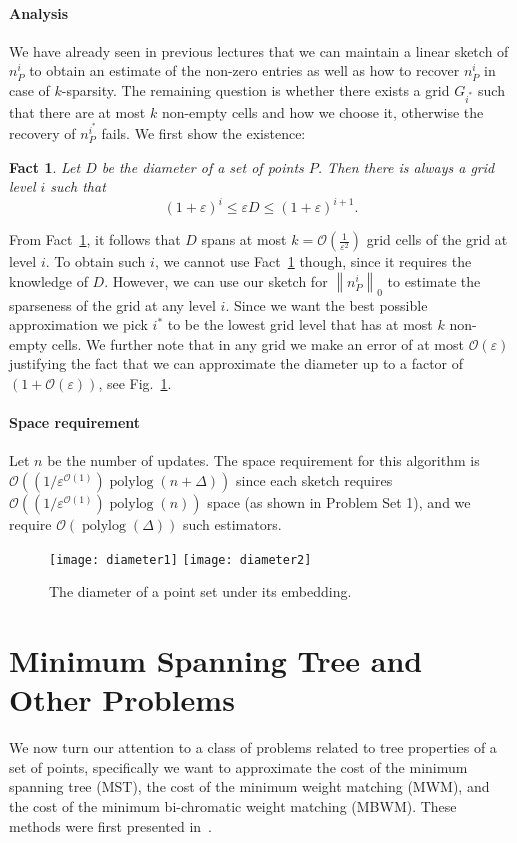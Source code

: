 \documentclass[11pt]{article}
\newcommand{\eps}{\varepsilon}
\DeclareMathOperator{\polylog}{\text{polylog}}
\renewcommand{\O}{\mathcal{O}}
\renewcommand{\epsilon}{\varepsilon}
\newcommand{\norm}[1]{\left\lVert {#1} \right\rVert}
\newtheorem{fact}[theorem]{Fact}
\begin{document}
\paragraph{Analysis}
We have already seen in previous lectures that we can maintain a linear sketch of $n_P^i$ to obtain an estimate of the non-zero entries as well as how to recover $n_P^i$ in case of $k$-sparsity. The remaining question is whether there exists a grid $G_{i^*}$ such that there are at most $k$ non-empty cells and how we choose it, otherwise the recovery of $n_P^{i^*}$ fails. We first show the existence: 
\begin{fact} \label{fact:sandwich}
	Let $D$ be the diameter of a set of points $P$. Then there is always a grid level $i$ such that
	\begin{equation*}
		(1+\epsilon)^i \le \eps D \le (1+\eps)^{i+1}.
	\end{equation*}
\end{fact}
From Fact~\ref{fact:sandwich}, it follows that $D$ spans at most $k = \O(\frac{1}{\eps^2})$ grid cells of the grid at level $i$. To obtain such $i$, we cannot use Fact~\ref{fact:sandwich} though, since it requires the knowledge of $D$. However, we can use our sketch for $\norm{n_P^i}_0$ to estimate the sparseness of the grid at any level $i$. Since we want the best possible approximation we pick $i^*$ to be the lowest grid level that has at most $k$ non-empty cells. We further note that in any grid we make an error of at most $\O(\eps)$ justifying the fact that we can approximate the diameter up to a factor of $(1+\O(\eps))$, see Fig.~\ref{fig:diameter}.

\paragraph{Space requirement}
Let $n$ be the number of updates. The space requirement for this algorithm is $\O((1/\eps^{\O(1)})\polylog(n + \Delta) )$ since each sketch requires $\O((1/\eps^{\O(1)})\polylog(n))$ space (as shown in Problem Set 1), and we require $\O(\polylog(\Delta))$ such estimators. 

\begin{figure}
	\centering
	\texttt{[image: diameter1]}
	\texttt{[image: diameter2]}
	\caption{The diameter of a point set under its embedding.}
	\label{fig:diameter}
\end{figure}

\section{Minimum Spanning Tree and Other Problems}
We now turn our attention to a class of problems related to tree properties of a set of points, specifically we want to approximate the cost of the minimum spanning tree (MST), the cost of the minimum weight matching (MWM), and the cost of the minimum bi-chromatic weight matching (MBWM). These methods were first presented in~\cite{indyk04}. 
\end{document}
